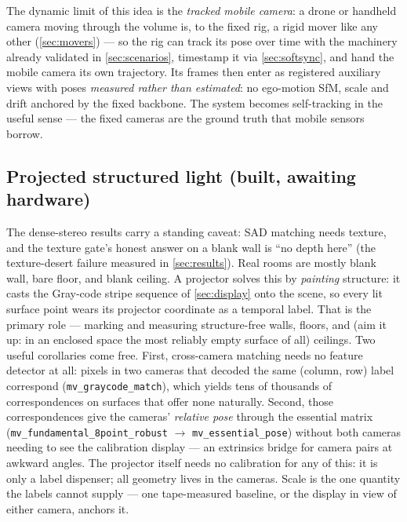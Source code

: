 \documentclass[11pt]{article}
\theoremstyle{definition}
\newcommand{\code}[1]{\texttt{#1}}
\begin{document}
The dynamic limit of this idea is the \emph{tracked mobile camera}: a
drone or handheld camera moving through the volume is, to the fixed rig,
a rigid mover like any other (\autoref{sec:movers}) --- so the rig can
track its pose over time with the machinery already validated in
\autoref{sec:scenarios}, timestamp it via \autoref{sec:softsync}, and
hand the mobile camera its own trajectory. Its frames then enter as
registered auxiliary views with poses \emph{measured rather than
estimated}: no ego-motion SfM, scale and drift anchored by the fixed
backbone. The system becomes self-tracking in the useful sense --- the
fixed cameras are the ground truth that mobile sensors borrow.

\subsection{Projected structured light (built, awaiting hardware)}
\label{sec:slight}

The dense-stereo results carry a standing caveat: SAD matching needs
texture, and the texture gate's honest answer on a blank wall is ``no
depth here'' (the texture-desert failure measured in
\autoref{sec:results}). Real rooms are mostly blank wall, bare
floor, and blank ceiling. A projector solves this by \emph{painting} structure: it casts
the Gray-code stripe sequence of \autoref{sec:display} onto the
scene, so every lit surface point wears its projector coordinate as a
temporal label. That is the primary role --- marking and measuring
structure-free walls, floors, and (aim it up: in an enclosed space
the most reliably empty surface of all) ceilings. Two useful corollaries come free.
First, cross-camera matching needs no feature detector at all: pixels
in two cameras that decoded the same (column, row) label correspond
(\code{mv\_graycode\_match}), which yields tens of thousands of
correspondences on surfaces that offer none naturally. Second, those
correspondences give the cameras' \emph{relative pose} through the
essential matrix (\code{mv\_fundamental\_8point\_robust} $\to$
\code{mv\_essential\_pose}) without both cameras needing to see the
calibration display --- an extrinsics bridge for camera pairs at
awkward angles. The projector itself needs no calibration for any of
this: it is only a label dispenser; all geometry lives in the
cameras. Scale is the one quantity the labels cannot supply --- one
tape-measured baseline, or the display in view of either camera,
anchors it.
\end{document}
